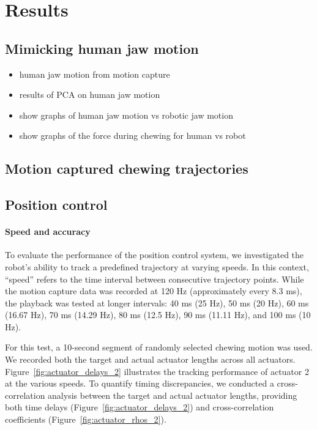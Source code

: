 \section{Results}
\subsection{Mimicking human jaw motion}
\begin{itemize}
    \item human jaw motion from motion capture
    \item results of PCA on human jaw motion
    \item show graphs of human jaw motion vs robotic jaw motion
    \item show graphs of the force during chewing for human vs robot
\end{itemize}

\subsection{Motion captured chewing trajectories}

\subsection{Position control}

\paragraph{Speed and accuracy}
To evaluate the performance of the position control system, we investigated the robot's ability to track a predefined trajectory at varying speeds. 
In this context, “speed” refers to the time interval between consecutive trajectory points. While the motion capture data was recorded at 120 Hz 
(approximately every 8.3 ms), the playback was tested at longer intervals: 40 ms (25 Hz), 50 ms (20 Hz), 60 ms (16.67 Hz), 70 ms (14.29 Hz), 80 ms 
(12.5 Hz), 90 ms (11.11 Hz), and 100 ms (10 Hz).

For this test, a 10-second segment of randomly selected chewing motion was used. We recorded both the target and actual actuator lengths across all 
actuators. Figure~\ref{fig:actuator_delays_2} illustrates the tracking performance of actuator 2 at the various speeds. To quantify timing discrepancies, we 
conducted a cross-correlation analysis between the target and actual actuator lengths, providing both time delays (Figure~\ref{fig:actuator_delays_2}) 
and cross-correlation coefficients (Figure~\ref{fig:actuator_rhos_2}).

